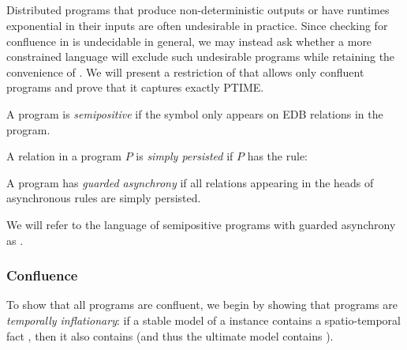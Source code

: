 \subsection{\large \bf \slang}

Distributed programs that produce non-deterministic outputs or have runtimes
exponential in their inputs are often undesirable in practice. Since checking for
confluence in \lang is undecidable in general, we may instead ask whether a more
constrained language will exclude such undesirable programs while retaining the
convenience of \lang.  We will present a restriction of \lang that allows only
confluent programs and prove that it captures exactly PTIME.

\begin{definition}
A \lang program is {\em semipositive} if the \dedalus{$\lnot$} symbol only appears on EDB relations in the program.
\end{definition}

\begin{definition}
A relation  in a \lang program $P$ is {\em simply persisted} if $P$ has the rule: 
\end{definition}

\begin{definition}
A \lang program has {\em guarded asynchrony} if all relations appearing in the heads of asynchronous rules are simply persisted.
\end{definition}

We will refer to the language of semipositive \lang programs with guarded
asynchrony as \slang.

\subsubsection{Confluence}

To show that all \slang programs are confluent, we begin by showing that \slang
programs are {\em temporally inflationary}: if a stable model of a \slang
instance contains a spatio-temporal fact , then it also contains
 (and thus the ultimate model contains ).

